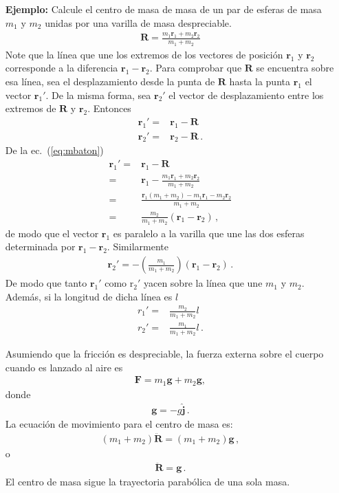 \begin{itemize}
\item[\textbf{Ejemplo:}] Calcule el centro de masa de masa de un par de esferas de masa $m_1$ y $m_2$ unidas por una varilla de masa despreciable.
  \begin{align}
    \label{eq:mbaton}
    \mathbf{R}=\frac{m_1\mathbf{r}_1+m_2\mathbf{r}_2}{m_1+m_2}
  \end{align}
Note que la línea que une los extremos de los vectores de posición $\mathbf{r}_1$ y $\mathbf{r}_2$ corresponde a la diferencia $\mathbf{r}_1-\mathbf{r}_2$. Para comprobar que $\mathbf{R}$ se encuentra sobre esa línea,
sea el desplazamiento desde la punta de $\mathbf{R}$ hasta la punta $\mathbf{r}_1$ el vector $\mathbf{r}_1'$. De la misma forma, sea $\mathbf{r}_2'$ el vector de desplazamiento entre los extremos de $\mathbf{R}$ y $\mathbf{r}_2$. Entonces
\begin{align}
  \mathbf{r}_1'=&\mathbf{r}_1-\mathbf{R}\nonumber\\
  \mathbf{r}_2'=&\mathbf{r}_2-\mathbf{R}\,.
\end{align}
De la ec.~(\ref{eq:mbaton})
\begin{align}
  \mathbf{r}_1'=&\mathbf{r}_1-\mathbf{R}\nonumber\\
  =&\mathbf{r}_1-\frac{m_1\mathbf{r}_1+m_2\mathbf{r}_2}{m_1+m_2}\nonumber\\
    =&\frac{\mathbf{r}_1(m_1+m_2)-m_1\mathbf{r}_1-m_2\mathbf{r}_2}{m_1+m_2}\nonumber\\
    =&\frac{m_2}{m_1+m_2}(\mathbf{r}_1-\mathbf{r}_2)\,,
\end{align}
de modo que el vector $\mathbf{r}_1$ es paralelo a la varilla que une las dos esferas determinada por $\mathbf{r}_1-\mathbf{r}_2$. Similarmente
\begin{align}
 \mathbf{r}_2'=-\left(\frac{m_1}{m_1+m_2} \right)\left(\mathbf{r}_1-\mathbf{r}_2 \right)\,.
\end{align}
De modo que tanto $\mathbf{r}_1'$ como $\mathrm{r}_2'$ yacen sobre la línea que une $m_1$ y $m_2$. Además, si la longitud de dicha línea es $l$
\begin{align}
  r_1'=&\frac{m_2}{m_1+m_2}l\nonumber\\
  r_2'=&\frac{m_1}{m_1+m_2}l\,.
\end{align}

Asumiendo que la fricción es despreciable, la fuerza externa sobre el cuerpo cuando es lanzado al aire es
\begin{align}
  \mathbf{F}=m_1\mathbf{g}+m_2\mathbf{g},
\end{align}
donde
\begin{align}
  \mathbf{g}=-g\hat{\mathbf{j}}\,.
\end{align}
La ecuación de movimiento para el centro de masa es:
\begin{align}
  \left(m_1+m_2 \right)\ddot{\mathbf{R}}=\left(m_1+m_2 \right)\mathbf{g}\,,
\end{align}
o
\begin{align}
  \ddot{\mathbf{R}}=\mathbf{g}\,.
\end{align}
El centro de masa sigue la trayectoria parabólica de una sola masa.
\end{itemize}

